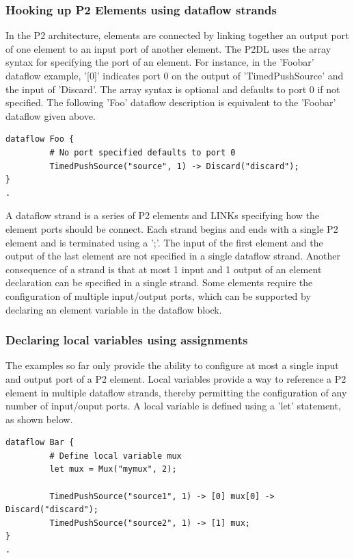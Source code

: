 \documentclass[12pt]{article}
\begin{document}
\subsubsection{Hooking up P2 Elements using dataflow strands}

In the P2 architecture, elements are connected by linking together an output port
of one element to an input port of another element. The P2DL uses the array syntax
for specifying the port of an element. For instance, in the 'Foobar' dataflow example,
'[0]' indicates port 0 on the output of 'TimedPushSource' and the input of 'Discard'.
The array syntax is optional and defaults to port 0 if not specified. The following 'Foo'
dataflow description is equivalent to the 'Foobar' dataflow given above.

\begin{verbatim}
dataflow Foo {
         # No port specified defaults to port 0
         TimedPushSource("source", 1) -> Discard("discard");
}
.
\end{verbatim}

A dataflow strand is a series of P2 elements and LINKs specifying how the element
ports should be connect. Each strand begins and ends with a single P2 element and
is terminated using a ';'. The input of the first element and the output of the last 
element are not specified in a single dataflow strand. Another consequence of a strand
is that at most 1 input and 1 output of an element declaration can be specified in a single 
strand. Some elements 
require the configuration of multiple input/output ports, which can be supported by
declaring an element variable in the dataflow block. 

\subsubsection{Declaring local variables using assignments}

The examples so far only provide the ability to configure at most
a single input and output port of a P2 element. Local variables provide a way
to reference a P2 element in multiple dataflow strands, thereby permitting the 
configuration of any number of input/ouput ports. A local variable is defined
using a 'let' statement, as shown below.

\begin{verbatim}
dataflow Bar {
         # Define local variable mux
         let mux = Mux("mymux", 2);
         
         TimedPushSource("source1", 1) -> [0] mux[0] -> Discard("discard");
         TimedPushSource("source2", 1) -> [1] mux;
}
.
\end{verbatim}
\end{document}

